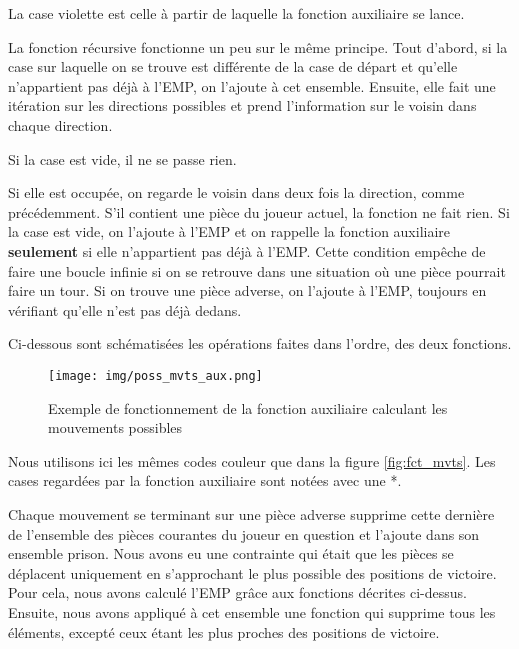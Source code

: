 \documentclass[a4paper]{article}
\begin{document}
\vspace{0.5cm}

La case violette est celle à partir de laquelle la fonction auxiliaire se lance.

\vspace{0.5cm}

La fonction récursive fonctionne un peu sur le même principe. Tout d'abord, si la case sur laquelle on se trouve est différente de la case de départ et qu'elle n'appartient pas déjà à l'EMP, on l'ajoute à cet ensemble. Ensuite, elle fait une itération sur les directions possibles et prend l'information sur le voisin dans chaque direction.

Si la case est vide, il ne se passe rien.

Si elle est occupée, on regarde le voisin dans deux fois la direction, comme précédemment. S'il contient une pièce du joueur actuel, la fonction ne fait rien. Si la case est vide, on l'ajoute à l'EMP et on rappelle la fonction auxiliaire \large\textbf{seulement} \normalsize si elle n'appartient pas déjà à l'EMP. Cette condition empêche de faire une boucle infinie si on se retrouve dans une situation où une pièce pourrait faire un tour. Si on trouve une pièce adverse, on l'ajoute à l'EMP, toujours en vérifiant qu'elle n'est pas déjà dedans.

Ci-dessous sont schématisées les opérations faites dans l'ordre, des deux fonctions.

\begin{figure}[H]
  \centering
  \texttt{[image: img/poss\_mvts\_aux.png]}
  \caption{Exemple de fonctionnement de la fonction auxiliaire calculant les mouvements possibles}
  \label{fig:fct_mvts_aux}
\end{figure}

Nous utilisons ici les mêmes codes couleur que dans la figure \ref{fig:fct_mvts}. Les cases regardées par la fonction auxiliaire sont notées avec une *.

\vspace{0.5cm}

Chaque mouvement se terminant sur une pièce adverse supprime cette dernière de l'ensemble des pièces courantes du joueur en question et l'ajoute dans son ensemble prison.
Nous avons eu une contrainte qui était que les pièces se déplacent uniquement en s'approchant le plus possible des positions de victoire. Pour cela, nous avons calculé l'EMP grâce aux fonctions décrites ci-dessus. Ensuite, nous avons appliqué à cet ensemble une fonction qui supprime tous les éléments, excepté ceux étant les plus proches des positions de victoire.
\end{document}
